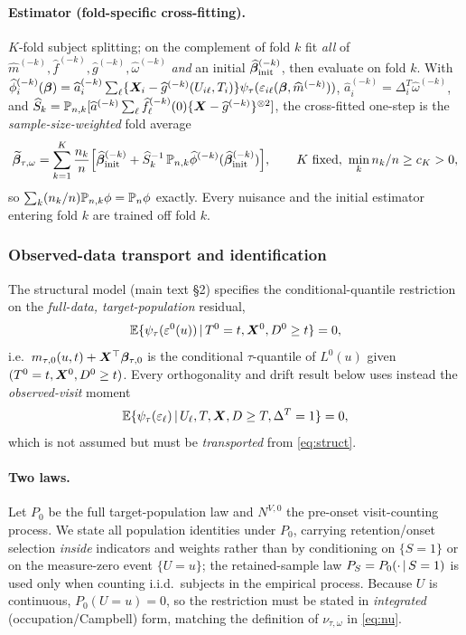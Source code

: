 \paragraph{Estimator (fold-specific cross-fitting).} $K$-fold subject splitting;
on the complement of fold $k$ fit \emph{all} of $\widehat m^{(-k)},\widehat
f^{(-k)},\widehat g^{(-k)},\widehat\omega^{(-k)}$ \emph{and} an initial
$\widehat{\bm{\beta}}_{\rm init}^{(-k)}$, then evaluate on fold $k$. With
$\widehat\phi_i^{(-k)}(\bm{\beta})=\widehat a_i^{(-k)}\sum_\ell\{\bm{X}_i-\widehat
g^{(-k)}(U_{i\ell},T_i)\}\psi_\tau(\varepsilon_{i\ell}(\bm{\beta},\widehat m^{(-k)}))$,
$\widehat a_i^{(-k)}=\Delta_i^T\widehat\omega^{(-k)}$, and
$\widehat S_k=\mathbb{P}_{n,k}[\widehat a^{(-k)}\sum_\ell\widehat f^{(-k)}_\ell(0)
\{\bm{X}-\widehat g^{(-k)}\}^{\otimes2}]$, the cross-fitted one-step is the
\emph{sample-size-weighted} fold average
\begin{equation}
\widetilde{\bm{\beta}}_{\tau,\omega}=\sum_{k=1}^K\frac{n_k}{n}\Big[\widehat{\bm{\beta}}_{\rm init}^{(-k)}
   +\widehat S_k^{-1}\,\mathbb{P}_{n,k}\widehat\phi^{(-k)}(\widehat{\bm{\beta}}_{\rm init}^{(-k)})\Big],
\qquad K\text{ fixed},\ \min_k n_k/n\ge c_K>0,
\label{eq:onestep}
\end{equation}
so $\sum_k(n_k/n)\mathbb{P}_{n,k}\phi=\mathbb{P}_n\phi$ exactly. Every nuisance and the initial
estimator entering fold $k$ are trained off fold $k$.

\subsubsection{Observed-data transport and identification}\label{sec:orth}
The structural model (main text \S2) specifies the conditional-quantile
restriction on the \emph{full-data, target-population} residual,
\begin{equation}
\mathbb{E}\{\psi_\tau(\varepsilon^0(u))\,\vert\, T^0=t,\bm{X}^0,D^0\ge t\}=0,
\label{eq:struct}
\end{equation}
i.e.\ $m_{\tau,0}(u,t)+\bm{X}^\top\bm{\beta}_{\tau,0}$ is the conditional $\tau$-quantile
of $L^0(u)$ given $(T^0=t,\bm{X}^0,D^0\ge t)$. Every orthogonality and drift result
below uses instead the \emph{observed-visit} moment
\begin{equation}
\mathbb{E}\{\psi_\tau(\varepsilon_\ell)\,\vert\, U_\ell,T,\bm{X},D\ge T,\Delta^T=1\}=0,
\label{eq:obsmoment}
\end{equation}
which is not assumed but must be \emph{transported} from \eqref{eq:struct}.

\paragraph{Two laws.} Let $P_0$ be the full target-population law and
$N^{V,0}$ the pre-onset visit-counting process. We state all population identities
under $P_0$, carrying retention/onset selection \emph{inside} indicators and
weights rather than by conditioning on $\{S=1\}$ or on the measure-zero event
$\{U=u\}$; the retained-sample law $P_S=P_0(\cdot\,\vert\, S=1)$ is used only when
counting i.i.d.\ subjects in the empirical process. Because $U$ is continuous,
$P_0(U=u)=0$, so the restriction must be stated in \emph{integrated}
(occupation/Campbell) form, matching the definition of $\nu_{\tau,\omega}$ in
\eqref{eq:nu}.

